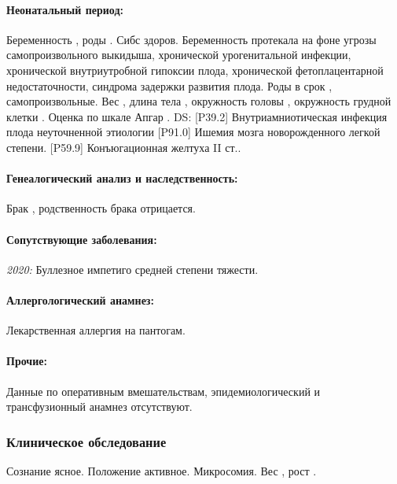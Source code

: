 \documentclass[a4paper,14pt]{extarticle}
\newcommand{\kilogramm}{кг}
\newcommand{\gramm}{г}
\newcommand{\cm}{см}
\newcommand{\weeks}{нед.}
\newcommand{\pdate}[1]{\emph{#1:} }
\newcommand{\DS}[2]{[#2] #1}
\begin{document}
\paragraph{Неонатальный период:} Беременность , роды . Сибс здоров. Беременность протекала на фоне угрозы самопроизвольного выкидыша, хронической урогенитальной инфекции, хронической внутриутробной гипоксии плода, хронической фетоплацентарной недостаточности, синдрома задержки развития плода. Роды в срок \numprint[\weeks]{39}, самопроизвольные. Вес \numprint[\gramm]{2860}, длина тела \numprint[\cm]{49}, окружность головы \numprint[\cm]{33}, окружность грудной клетки \numprint[\cm]{30}. Оценка по шкале Апгар . DS: \DS{Внутриамниотическая инфекция плода неуточненной этиологии}{P39.2} \DS{Ишемия мозга новорожденного легкой степени}{P91.0}. \DS{Конъюгационная желтуха II ст.}{P59.9}.

\paragraph{Генеалогический анализ и наследственность:} Брак , родственность брака отрицается.

\paragraph{Сопутствующие заболевания:} \pdate{2020} Буллезное импетиго средней степени тяжести.

\paragraph{Аллергологический анамнез:} Лекарственная аллергия на пантогам.

\paragraph{Прочие:} Данные по оперативным вмешательствам, эпидемиологический и трансфузионный анамнез отсутствуют.

\subsubsection*{Клиническое обследование}

Сознание ясное. Положение активное. Микросомия. Вес \numprint[\kilogramm]{6}, рост \numprint[\cm]{68}.
\end{document}
